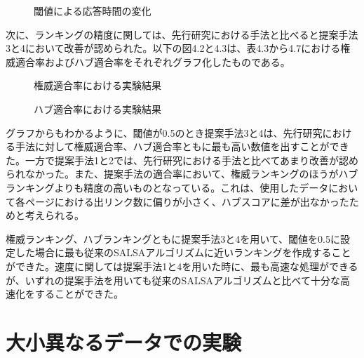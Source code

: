 \documentclass[a4paper,11pt]{jreport}
\begin{document}
\begin{figure}[htbp]
\begin{center}
\end{center}
\caption{閾値による応答時間の変化}
\label{figure:sample}
\end{figure}

\clearpage

次に、ランキングの精度に関しては、先行研究における手法と比べると提案手法3と4において改善が認められた。以下の図4.2と4.3は、表4.3から4.7における権威適合率およびハブ適合率をそれぞれグラフ化したものである。

\begin{figure}[htbp]
\begin{center}
\end{center}
\caption{権威適合率における実験結果}
\label{figure:sample}
\end{figure}

\begin{figure}[htbp]
\begin{center}
\end{center}
\caption{ハブ適合率における実験結果}
\label{figure:sample}
\end{figure}

グラフからもわかるように、閾値が0.5のとき提案手法3と4は、先行研究における手法に対して権威適合率、ハブ適合率ともに最も高い数値を出すことができた。一方で提案手法1と2では、先行研究における手法と比べてあまり改善が認められなかった。また、提案手法の適合率において、権威ランキングのほうがハブランキングよりも精度の高いものとなっている。これは、使用したデータにおいて各ページにおける出リンク数に偏りが小さく、ハブスコアに差が出なかったためと考えられる。

権威ランキング、ハブランキングともに提案手法3と4を用いて、閾値を0.5に設定した場合に最も従来のSALSAアルゴリズムに近いランキングを作成することができた。速度に関しては提案手法1と4を用いた時に、最も高速な処理ができるが、いずれの提案手法を用いても従来のSALSAアルゴリズムと比べて十分な高速化をすることができた。

\clearpage

\section{大小異なるデータでの実験}
\end{document}
